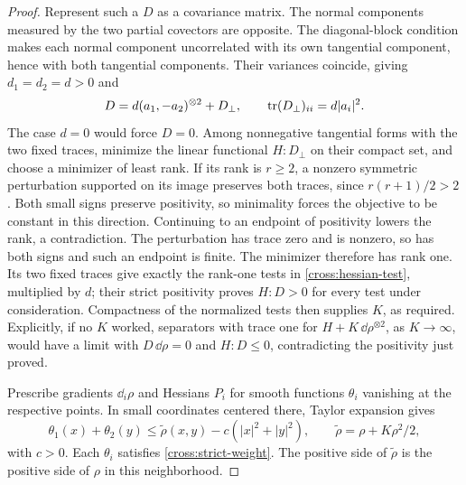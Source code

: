 \begin{proof}
Represent such a $D$ as a covariance matrix.  The normal components
measured by the two partial covectors are opposite.  The diagonal-block
condition makes each normal component uncorrelated with its own
tangential component, hence with both tangential components.
Their variances coincide, giving $d_1=d_2=d>0$ and
\[
 D=d(a_1,-a_2)^{\otimes2}+D_\perp,
 \qquad \operatorname{tr}(D_\perp)_{ii}=d|a_i|^2.
\]
The case $d=0$ would force $D=0$. Among nonnegative tangential forms
with the two fixed traces, minimize the linear functional $H:D_\perp$
on their compact set, and choose a minimizer of least rank. If its rank
is $r\ge2$, a nonzero symmetric perturbation supported on its image
preserves both traces, since $r(r+1)/2>2$. Both small signs preserve
positivity, so minimality forces the objective to be constant in this
direction. Continuing to an endpoint of positivity lowers the rank,
a contradiction. The perturbation has trace zero and is nonzero, so
has both signs and such an endpoint is finite. The minimizer therefore
has rank one. Its two fixed traces give exactly the rank-one tests
in \eqref{cross:hessian-test}, multiplied by $d$; their strict positivity
proves $H:D>0$ for every test under consideration. Compactness of the
normalized tests then supplies $K$, as required. Explicitly, if no $K$
worked, separators with trace one for $H+K\,\dd\rho^{\otimes2}$,
as $K\to\infty$, would have a limit with $D\,\dd\rho=0$ and
$H:D\le0$, contradicting the positivity just proved.

Prescribe gradients $\dd_i\rho$ and Hessians $P_i$ for smooth functions
$\theta_i$ vanishing at the respective points.  In small coordinates
centered there, Taylor expansion gives
\begin{equation}\label{cross:quadratic-gap}
 \theta_1(x)+\theta_2(y)
 \le \widetilde\rho(x,y)-c(|x|^2+|y|^2),
 \qquad \widetilde\rho=\rho+K\rho^2/2,
\end{equation}
with $c>0$.  Each $\theta_i$ satisfies
\eqref{cross:strict-weight}.  The positive side of $\widetilde\rho$
is the positive side of $\rho$ in this neighborhood.


\end{proof}
